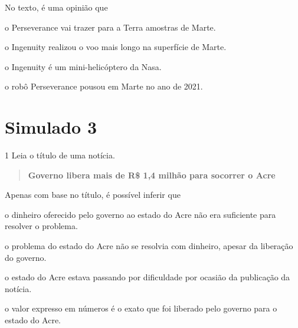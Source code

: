 No texto, é uma opinião que

\begin{escolha}
\item o Perseverance vai trazer para a Terra amostras de Marte.

\item o Ingenuity realizou o voo mais longo na superfície de Marte.

\item o Ingenuity é um mini-helicóptero da Nasa.

\item o robô Perseverance pousou em Marte no ano de 2021.
\end{escolha}


\chapter{Simulado 3}

\num{1} Leia o título de uma notícia.

\begin{quote}
\textbf{Governo libera mais de R\$ 1,4 milhão para socorrer o Acre}

\end{quote}

Apenas com base no título, é possível inferir que

\begin{escolha}
\item o dinheiro oferecido pelo governo ao estado do Acre não era suficiente para resolver o problema.

\item o problema do estado do Acre não se resolvia com dinheiro, apesar da liberação do governo.

\item o estado do Acre estava passando por dificuldade por ocasião da publicação da notícia.

\item o valor expresso em números é o exato que foi liberado pelo governo para o estado do Acre.
\end{escolha}

